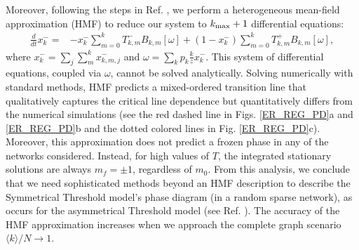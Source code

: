     Moreover, following the steps in Ref. \cite{gleeson-2013}, we perform a heterogeneous mean-field approximation (HMF) to reduce our system to $k_{\rm max}+1$ differential equations:
    \begin{eqnarray}
    \frac{d}{d t} x^{-}_{k}= &- x^{-}_{k} \sum_{m=0}^{k} T^{-}_{k, m} B_{k, m}[\omega] +\left(1-x^{-}_{k}\right) \sum_{m=0}^{k} T^{+}_{k, m} B_{k, m}[\omega],
    \label{eq:HMF}
    \end{eqnarray}
    where $x^{-}_{k} = \sum_{j} \sum_{m}^{k} x^{-}_{k,m,j}$ and $\omega= \sum_k p_k \frac{k}{z} x^{-}_{k}$. This system of differential equations, coupled via $\omega$, cannot be solved analytically. Solving numerically with standard methods, HMF predicts a mixed-ordered transition line that qualitatively captures the critical line dependence but quantitatively differs from the numerical simulations (see the red dashed line in Figs. \ref{ER_REG_PD}a and \ref{ER_REG_PD}b and the dotted colored lines in Fig. \ref{ER_REG_PD}c). Moreover, this approximation does not predict a frozen phase in any of the networks considered. Instead, for high values of $T$, the integrated stationary solutions are always $m_f = \pm 1$, regardless of $m_0$. From this analysis, we conclude that we need sophisticated methods beyond an HMF description to describe the Symmetrical Threshold model's phase diagram (in a random sparse network), as occurs for the asymmetrical Threshold model (see Ref. \cite{Abella-2022-AME}). The accuracy of the HMF approximation increases when we approach the complete graph scenario $\langle k \rangle/ N \to 1$.